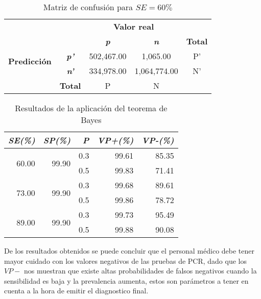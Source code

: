 \documentclass{article}
\begin{document}
\begin{table}
  \centering
  \caption{Matriz de confusión para $SE = 60\%$ }
    \begin{tabular}{rcccr}
    \toprule
          &       & \multicolumn{2}{c}{\textbf{Valor real}} &  \\
          &       & \textit{\textbf{p}} & \textit{\textbf{n}} & \multicolumn{1}{c}{\textbf{Total}} \\
\cmidrule{3-4}          & \multicolumn{1}{c|}{\multirow{2}[2]{*}{\textit{\textbf{p'}}}} & \multicolumn{1}{c|}{\multirow{2}[2]{*}{502,467.00}} & \multicolumn{1}{c|}{\multirow{2}[2]{*}{1,065.00}} & \multicolumn{1}{c}{\multirow{2}[2]{*}{P'}} \\
    \multicolumn{1}{c}{\multirow{2}[2]{*}{\textbf{Predicción}}} & \multicolumn{1}{c|}{} & \multicolumn{1}{c|}{} & \multicolumn{1}{c|}{} &  \\
\cmidrule{3-4}          & \multicolumn{1}{c|}{\multirow{2}[2]{*}{\textit{\textbf{n'}}}} & \multicolumn{1}{c|}{\multirow{2}[2]{*}{334,978.00}} & \multicolumn{1}{c|}{\multirow{2}[2]{*}{1,064,774.00}} & \multicolumn{1}{c}{\multirow{2}[2]{*}{N'}} \\
          & \multicolumn{1}{c|}{} & \multicolumn{1}{c|}{} & \multicolumn{1}{c|}{} &  \\
\cmidrule{3-4}          & \textbf{Total} & P     & N     &  \\
    \bottomrule
    \end{tabular}%
  \label{tab:1}%
\end{table}%


\begin{table}
  \centering
  \caption{Resultados de la aplicación del teorema de Bayes}
    \begin{tabular}{rrrrr}
    \toprule
    \textit{\textbf{SE(\%)}} & \textit{\textbf{SP(\%) }} & \textit{\textbf{P}} & \textit{\textbf{VP+(\%)}} & \textit{\textbf{VP-(\%)}} \\
    \midrule
    \multirow{2}[1]{*}{60.00} & \multirow{2}[1]{*}{99.90} & 0.3   & 99.61 & 85.35 \\
          &       & 0.5   & 99.83 & 71.41 \\
    \multirow{2}[0]{*}{73.00} & \multirow{2}[0]{*}{99.90} & 0.3   & 99.68 & 89.61 \\
          &       & 0.5   & 99.86 & 78.72 \\
    \multirow{2}[1]{*}{89.00} & \multirow{2}[1]{*}{99.90} & 0.3   & 99.73 & 95.49 \\
          &       & 0.5   & 99.88 & 90.08 \\
    \bottomrule
    \end{tabular}%
  \label{tab:2}%
\end{table}%

De los resultados obtenidos se puede concluir que el personal médico debe tener mayor cuidado con los valores negativos de las pruebas de PCR, dado que los $VP-$ nos muestran que existe altas probabilidades de falsos negativos cuando la sensibilidad es baja y la prevalencia aumenta, estos son parámetros a tener en cuenta a la hora de emitir el diagnostico final.





\newpage


\end{document}
